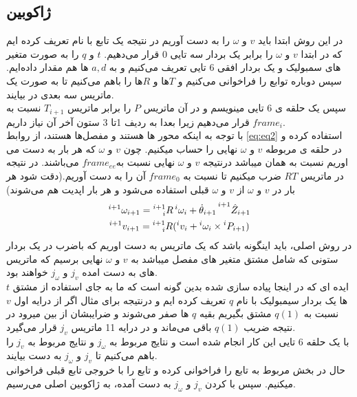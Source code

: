\documentclass{article}
\begin{document}
\subsection{ژاکوبین }
در این روش ابتدا باید $v$ و $\omega$ را به دست آوریم در نتیجه یک تابع با نام  تعریف کرده ایم که در ابتدا $v$ و $\omega$ را برابر یک بردار سه تایی 0 قرار می‌دهیم. $t$ و $q$ را به صورت متغیر های سمبولیک و یک بردار افقی 6 تایی تعریف می‌کنیم و به $a, d$ ها هم مقدار داده‌ایم.
سپس دوباره توابع  را فراخوانی می‌کنیم و $T$ها و $R$ها را باهم   می‌کنیم تا به صورت یک ماتریس سه بعدی در بیایند.
\\
سپس یک حلقه ی 6 تایی مینویسم و در آن ماتریس $P$ را برابر ماتریس $T_{i+1}$ نسبت به $frame_{i}$ قرار می‌دهیم زیرا بعدا به ردیف 1تا 3  ستون آخر آن نیاز داریم.
\\
با توجه به اینکه محور ها  هستند و مفصل‌ها  هستند، از روابط \ref{eq:eq2} استفاده کرده و در حلقه ی  مربوطه $v$ و $\omega$  نهایی را حساب میکنیم. چون $v$ و $\omega$ که هر بار به دست می اوریم نسبت به همان  میباشد درنتیجه $v$ و $\omega$ نهایی نسبت به$ frame_{ee}$ می‌باشند. در نتیجه در ماتریس $RT$ ضرب میکنیم تا نسبت به $frame_{0}$ آن را به دست آوریم.(دقت شود هر بار در $v$ و $\omega$ از $v$ و $\omega$ قبلی استفاده می‌شود و هر بار اپدیت هم می‌شوند)
\begin{equation}
\begin{gathered}
\prescript{i+1}{}{\omega_{i+1}} = \prescript{i+1}{i}{R} \prescript{i}{}{\omega_i} + \dot{\theta}_{i+1} \prescript{i+1}{}{\hat{Z}_{i+1}} \\
\prescript{i+1}{}{v_{i+1}} = \prescript{i+1}{i}{R}(\prescript{i}{}{v_i}+\prescript{i}{}{\omega _i} \times \prescript{i}{}{P_{i+1}})
\end{gathered}
\label{eq:eq2}
\end{equation}
در روش اصلی، باید اینگونه باشد که یک ماتریس به دست اوریم که باضرب در یک بردار ستونی که شامل مشتق متغیر های مفصل میباشد به $v$ و $\omega$ نهایی برسیم که ماتریس های به دست امده $j_{v}$ و $j_{\omega}$  خواهند بود.
\\
ایده ای که در اینجا پیاده سازی شده بدین گونه است که ما به جای استفاده از  مشتق $t$ ها یک بردار سیمبولیک با نام $q$ تعریف کرده ایم  و درنتیجه برای مثال اگر از درایه اول $v$ نسبت به $q(1)$ مشتق بگیریم بقیه $q$ ها صفر می‌شوند و ضرایبشان از بین میرود در نتیجه ضریب $q(1)$ باقی می‌ماند و در درایه 11 ماتریس $j_{v}$ قرار می‌گیرد.
\\
با یک حلقه 6 تایی این کار انجام شده است و نتایج مربوط به $j_{\omega}$  و نتایج مربوط به $j_{v}$ را باهم    می‌کنیم تا $j_{v}$ و $j_{\omega}$ به دست بیایند.
\\
حال در بخش مربوط به   تابع  را فراخوانی کرده و تابع   را با خروجی تابع قبلی فراخوانی میکنیم.
سپس با  کردن $j_{v}$ و $j_{\omega}$ به دست آمده، به ژاکوبین اصلی می‌رسیم.
\end{document}
